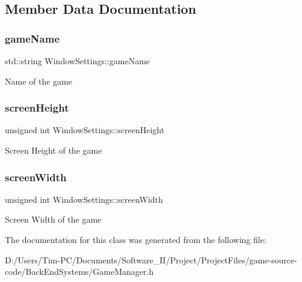 \subsection{Member Data Documentation}
\mbox{\label{struct_window_settings_a32c14bbed2528fb85dad16f4c51facba}} 
\subsubsection{\texorpdfstring{game\+Name}{gameName}}
{\footnotesize\ttfamily std\+::string Window\+Settings\+::game\+Name}

Name of the game \mbox{\label{struct_window_settings_a7a55e4202ec4cf5a902705378aaeba05}} 
\subsubsection{\texorpdfstring{screen\+Height}{screenHeight}}
{\footnotesize\ttfamily unsigned int Window\+Settings\+::screen\+Height}

Screen Height of the game \mbox{\label{struct_window_settings_a92700db968541f97969b92c619387632}} 
\subsubsection{\texorpdfstring{screen\+Width}{screenWidth}}
{\footnotesize\ttfamily unsigned int Window\+Settings\+::screen\+Width}

Screen Width of the game 

The documentation for this class was generated from the following file\+:\begin{DoxyCompactItemize}
\item 
D\+:/\+Users/\+Tim-\/\+P\+C/\+Documents/\+Software\+\_\+\+I\+I/\+Project/\+Project\+Files/game-\/source-\/code/\+Back\+End\+Systems/Game\+Manager.\+h\end{DoxyCompactItemize}
